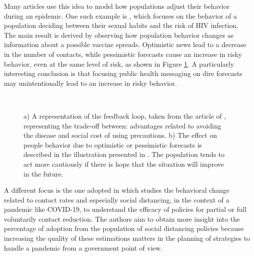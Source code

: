 Many articles use this idea to model how populations adjust their behavior during an epidemic. One such example is  \cite{Auld_2003}, which focuses on the behavior of a population deciding between their sexual habits and the risk of HIV infection. The main result is derived by observing how population behavior changes as information about a possible vaccine spreads. Optimistic news lead to a decrease in the number of contacts, while pessimistic forecasts cause an increase in risky behavior, even at the same level of risk, as shown in Figure \ref{fig:abm_game}. A particularly interesting conclusion is that focusing public health messaging on dire forecasts may unintentionally lead to an increase in risky behavior.

\begin{figure}[ht]
	\centering
	 \quad
	 \\
	\caption[Game theory]{a) A representation of the feedback loop, taken from the article of \cite{Wang_2015}, representing the trade-off between: advantages related to avoiding the disease and social cost of using precautions.  b) The effect on people behavior due to optimistic or pessimistic forecasts is described in the illustration presented in \cite{Auld_2003}. The population tends to act more cautiously if there is hope that the situation will improve in the future.}
	\label{fig:abm_game}
\end{figure}

A different focus is the one adopted in \cite{Gosak_2021_game} which studies the behavioral change related to contact rates and especially social distancing, in the context of a pandemic like COVID-19, to understand the efficacy of policies for partial or full voluntarily contact reduction. The authors aim to obtain more insight into the percentage of adoption from the population of social distancing policies because increasing the quality of these estimations matters in the planning of strategies to handle a pandemic from a government point of view.

